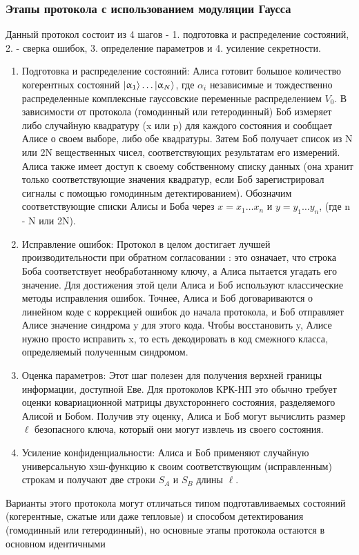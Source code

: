 \subsubsection{Этапы протокола с использованием модуляции Гаусса}
Данный протокол состоит из 4 шагов - 1. подготовка и распределение состояний, 2. - сверка ошибок, 3. определение параметров и 4. усиление секретности. 
\begin{enumerate}
    \item Подготовка и распределение состояний: Алиса готовит большое количество когерентных состояний $\lvert\upalpha_1\rangle \dots \lvert\upalpha_N\rangle $, где $\alpha_i$ независимые и тождественно распределенные комплексные гауссовские переменные распределением $V_0$. В зависимости от протокола (гомодинный или гетеродинный) Боб измеряет либо случайную квадратуру (x или p) для каждого состояния и сообщает Алисе о своем выборе, либо обе квадратуры. Затем Боб получает список из N или 2N вещественных чисел, соответствующих результатам его измерений. Алиса также имеет доступ к своему собственному списку данных (она хранит только соответствующие значения квадратур, если Боб зарегистрировал сигналы с помощью гомодинным детектированием). Обозначим соответствующие списки Алисы и Боба через  $x = {x_1 \dots x_n}$ и $y = {y_1 \dots y_n}$, (где n - N или 2N).
    \item Исправление ошибок: Протокол в целом достигает лучшей производительности при обратном согласовании : это означает, что строка Боба соответствует необработанному ключу, а Алиса пытается угадать его значение. Для достижения этой цели Алиса и Боб используют классические методы исправления ошибок. Точнее, Алиса и Боб договариваются о линейном коде с коррекцией ошибок до начала протокола, и Боб отправляет Алисе значение синдрома y для этого кода. Чтобы восстановить y, Алисе нужно просто исправить x, то есть декодировать в код смежного класса, определяемый полученным синдромом. 
    \item Оценка параметров: Этот шаг полезен для получения верхней границы информации, доступной Еве. Для протоколов КРК-НП это обычно требует оценки ковариационной матрицы двухстороннего состояния, разделяемого Алисой и Бобом. Получив эту оценку, Алиса и Боб могут вычислить размер $\ell$ безопасного ключа, который они могут извлечь из своего состояния.
    \item Усиление конфиденциальности: Алиса и Боб применяют случайную универсальную хэш-функцию к своим соответствующим (исправленным) строкам и получают две строки $S_A$  и $S_B$ длины $\ell$.
\end{enumerate}
Варианты этого протокола могут отличаться типом подготавливаемых состояний (когерентные, сжатые или даже тепловые) и способом детектирования (гомодинный или гетеродинный), но основные этапы протокола остаются в основном идентичными

